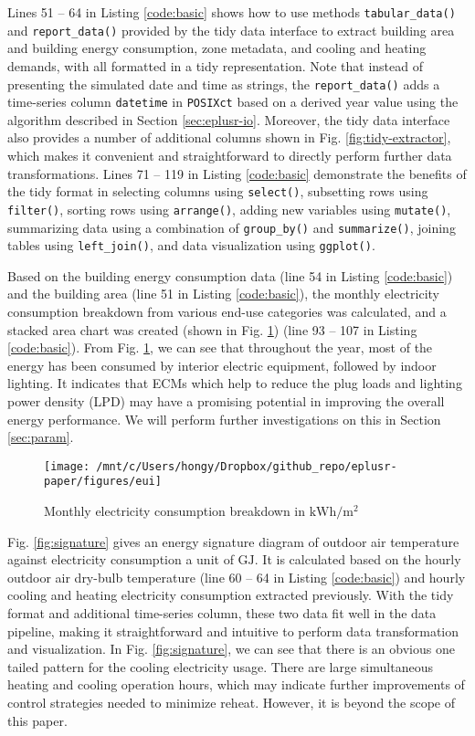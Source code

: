 \documentclass[3p, times]{elsarticle} %
\begin{document}
Lines 51 -- 64 in Listing \ref{code:basic} shows how to use methods
\texttt{tabular\_data()} and \texttt{report\_data()} provided by the tidy data
interface to extract building area and building energy consumption, zone
metadata, and cooling and heating demands, with all formatted in a tidy
representation.
Note that instead of presenting the simulated date and time as strings,
the \texttt{report\_data()} adds a time-series column \texttt{datetime} in \texttt{POSIXct} based on
a derived year value using the algorithm described in Section
\ref{sec:eplusr-io}.
Moreover, the tidy data interface also provides a number of additional columns
shown in Fig. \ref{fig:tidy-extractor}, which makes it convenient and
straightforward to directly perform further data transformations.
Lines 71 -- 119 in Listing \ref{code:basic} demonstrate the benefits of the
tidy format in selecting columns using \texttt{select()}, subsetting rows using
\texttt{filter()}, sorting rows using \texttt{arrange()}, adding new variables using
\texttt{mutate()}, summarizing data using a combination of \texttt{group\_by()} and
\texttt{summarize()}, joining tables using \texttt{left\_join()}, and data visualization using
\texttt{ggplot()}.

Based on the building energy consumption data (line 54 in Listing
\ref{code:basic}) and the building area (line 51 in Listing
\ref{code:basic}), the monthly electricity consumption breakdown from various end-use
categories was calculated, and a stacked area chart was created (shown in Fig.
\ref{fig:eui}) (line 93 -- 107 in Listing
\ref{code:basic}). From Fig. \ref{fig:eui}, we can see that throughout the
year, most of the energy has been consumed by interior electric equipment,
followed by indoor lighting.
It indicates that ECMs which help to reduce the plug loads and lighting power
density (LPD) may have a promising potential in improving the overall energy
performance.
We will perform further investigations on this in Section \ref{sec:param}.

\begin{figure}[!htb]
\texttt{[image: /mnt/c/Users/hongy/Dropbox/github\_repo/eplusr-paper/figures/eui]} \caption{Monthly electricity consumption breakdown in $\mathrm{kWh}/\mathrm{m}^2$}\label{fig:eui}
\end{figure}

Fig. \ref{fig:signature} gives an energy signature diagram of outdoor air
temperature against electricity consumption a unit of \(\mathrm{GJ}\).
It is calculated based on the hourly outdoor air dry-bulb temperature
(line 60 -- 64 in Listing \ref{code:basic}) and hourly cooling and heating
electricity consumption extracted previously.
With the tidy format and additional time-series column, these two data fit well in the
data pipeline, making it straightforward and intuitive to perform data
transformation and visualization. In Fig. \ref{fig:signature}, we can
see that there is an obvious one tailed pattern for the cooling electricity usage.
There are large simultaneous heating and cooling operation hours, which may
indicate further improvements of control strategies needed to minimize reheat.
However, it is beyond the scope of this paper.
\end{document}
